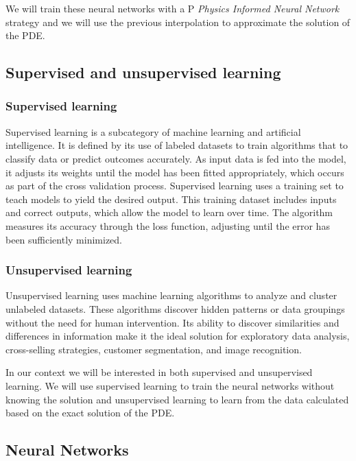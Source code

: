 \documentclass{article}
\begin{document}
We will train these neural networks with a P \textit{Physics Informed Neural Network} strategy and we will use the previous interpolation to approximate the solution of the PDE.

\subsection{Supervised and unsupervised learning}

\subsubsection{Supervised learning}

Supervised learning is a subcategory of machine learning and artificial intelligence. 
It is defined by its use of labeled datasets to train algorithms that to classify data or predict outcomes accurately. As input data is fed into the model, 
it adjusts its weights until the model has been fitted appropriately, which occurs as part of the cross validation process. Supervised learning uses a training set to teach models to yield the desired output. This training dataset includes inputs and correct outputs, which allow the model to learn over time. The algorithm measures its accuracy through the loss function, 
adjusting until the error has been sufficiently minimized. 

\subsubsection{Unsupervised learning}
Unsupervised learning uses machine learning algorithms to analyze and cluster unlabeled datasets. These algorithms discover hidden patterns or data groupings without the need for human intervention. Its ability to discover similarities and differences in information make it the ideal solution for exploratory data analysis, cross-selling strategies, customer segmentation, and image recognition.


In our context we will be interested in both supervised and unsupervised learning. We will use supervised learning to train the neural networks without knowing the solution and unsupervised learning to learn from the data calculated based on the exact solution of the PDE.

\subsection{Neural Networks}
\end{document}
